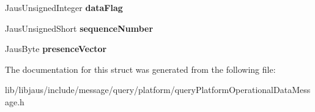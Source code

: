 \begin{DoxyCompactItemize}
\item 
\hypertarget{struct_query_platform_operational_data_message_struct_abd66f64923350a5e930add25a576b357}{\-Jaus\-Unsigned\-Integer {\bfseries data\-Flag}}\label{struct_query_platform_operational_data_message_struct_abd66f64923350a5e930add25a576b357}

\item 
\hypertarget{struct_query_platform_operational_data_message_struct_aebc8b50a465d3e8795cde6977befb3ef}{\-Jaus\-Unsigned\-Short {\bfseries sequence\-Number}}\label{struct_query_platform_operational_data_message_struct_aebc8b50a465d3e8795cde6977befb3ef}

\item 
\hypertarget{struct_query_platform_operational_data_message_struct_a15f8af16b66ef003c142629a995d9dba}{\-Jaus\-Byte {\bfseries presence\-Vector}}\label{struct_query_platform_operational_data_message_struct_a15f8af16b66ef003c142629a995d9dba}

\end{DoxyCompactItemize}


\-The documentation for this struct was generated from the following file\-:\begin{DoxyCompactItemize}
\item 
lib/libjaus/include/message/query/platform/query\-Platform\-Operational\-Data\-Message.\-h\end{DoxyCompactItemize}
